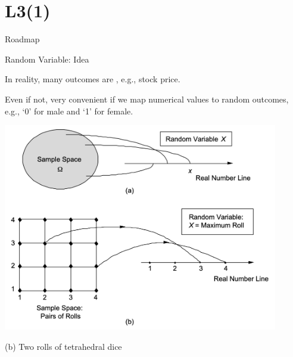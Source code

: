 \section{L3(1)}
\begin{frame}{Roadmap}

\plitemsep 0.1in

\bce[(1)]

\item {}

\item {}

\ece 

\end{frame}

\begin{frame}{Random Variable: Idea}


{
\plitemsep 0.1in

\bci 
\item In reality, many outcomes are , e.g., stock price.

\item Even if not, very convenient if we map numerical values to random outcomes, e.g., `0' for male and `1' for female.

\eci 
}
{
\centering
\includegraphics[width=0.9\textwidth]{L3_RV_ex.png}

{\scriptsize (b) Two rolls of tetrahedral dice}
}

\end{frame}

